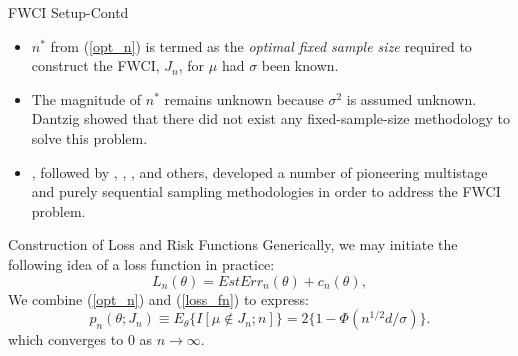 \documentclass [xcolor=svgnames, t] {beamer}
\begin{document}
 \begin{frame}{FWCI Setup-Contd}
  \vspace{5mm}

\begin{itemize}
\item $n^*$ from (\ref{opt_n}) is termed as the \textit{optimal fixed sample size} required to 
construct the FWCI, $J_n$, for $\mu$ had $\sigma$ been known.
\item The magnitude of $n^*$ remains unknown because $\sigma^2$ is 
assumed unknown. Dantzig\cite{dantzig1940} showed that there 
did not exist any fixed-sample-size methodology to solve this problem.
\item \cite{stein1945}, \cite{stein1949} followed by \cite{anscombe1952}, \cite{anscombe1953}, \cite{ray1957}, \cite{chow1965} and
others, developed a number of pioneering multistage and purely sequential sampling
methodologies in order to address the FWCI problem.
\end{itemize}


\end{frame}
\begin{frame}{Construction of Loss and Risk Functions}
    \vspace{5mm}
    Generically, we may initiate the following idea of a loss function in practice:
        \begin{equation} \label{loss_fn}
            L_n(\theta)  = EstErr_n(\theta)+c_n(\theta),
        \end{equation}
        \vspace{2mm}
    We combine (\ref{opt_n}) and (\ref{loss_fn}) to express:
        \begin{equation} \label{p_n_theta}
        p_n(\theta ;J_n) \equiv E_{\theta} \{ {I[ \mu \not\in J_n;n]}\} =2\{ 1-\Phi(n^{1/2}d/\sigma) \}.
        \end{equation}
        which converges to $0$ as $n \rightarrow \infty$.\\
        \vspace{0.1cm}
                
\end{frame}
\end{document}
